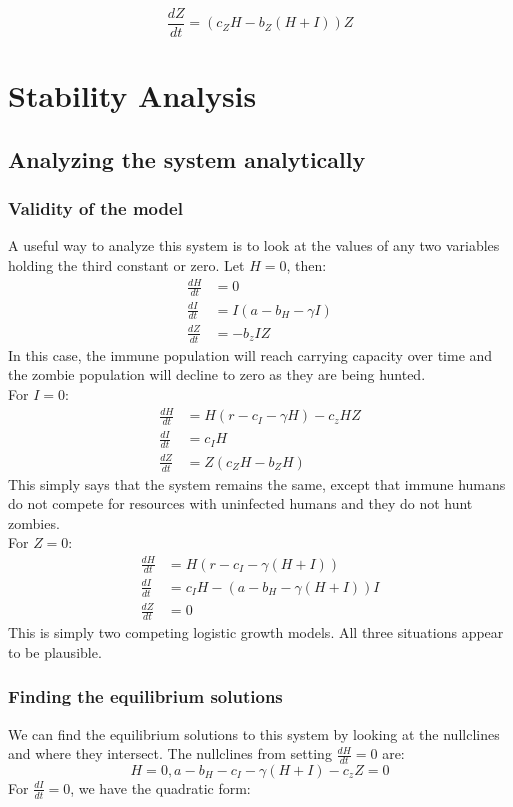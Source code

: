 \documentclass[
	12pt
]{article}
\begin{document}
\begin{equation}
\frac{dZ}{dt} = (c_ZH-b_Z(H+I))Z
\end{equation}

\section{Stability Analysis}
	\subsection{Analyzing the system analytically}
		\subsubsection{Validity of the model}
			A useful way to analyze this system is to look at the values of any two variables holding the third constant or zero.
			Let $H= 0$, then:
			\begin{align*}
				\frac{dH}{dt} &=0\\
				\frac{dI}{dt} &= I(a-b_H-\gamma I)\\
				\frac{dZ}{dt} &= -b_z IZ
			\end{align*}
			In this case, the immune population will reach carrying capacity over time and the zombie population will decline to zero as they are being hunted. \\
			For $I=0$:
			\begin{align*}
				\frac{dH}{dt} &= H(r-c_I-\gamma H)-c_z HZ\\
				\frac{dI}{dt} &= c_IH\\
				\frac{dZ}{dt} &= Z(c_ZH-b_ZH)
			\end{align*}	
			This simply says that the system remains the same, except that immune humans do not compete for resources with uninfected humans and they do not hunt zombies.\\
			For $Z=0$:
			\begin{align*}
				\frac{dH}{dt} &= H(r-c_I-\gamma (H+I))\\
				\frac{dI}{dt} &= c_IH-(a-b_H-\gamma(H+I))I \\
				\frac{dZ}{dt} &= 0
			\end{align*}
			This is simply two competing logistic growth models. All three situations appear to be plausible.
		\subsubsection{Finding the equilibrium solutions}
We can find the equilibrium solutions to this system by looking at the nullclines and where they intersect. The nullclines from setting $\frac{dH}{dt}=0$ are:
\begin{equation}
H=0, a-b_H-c_I-\gamma(H+I)-c_zZ=0
\end{equation}
For $\frac{dI}{dt}=0$, we have the quadratic form:
\end{document}
